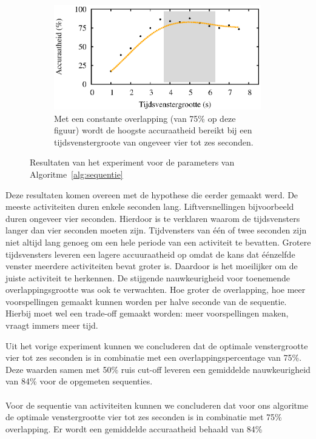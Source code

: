 \documentclass{article}
\begin{document}
\begin{figure}[h]
  \begin{subfigure}[b]{.99\linewidth}
    \centering
    \includegraphics[width=0.99\textwidth]{figures/constantoverlap}
    \caption{Met een constante overlapping (van 75\% op deze figuur) wordt de hoogste accuraatheid bereikt bij een tijdsvenstergroote van ongeveer vier tot zes seconden.}\label{fig:seq2d}
  \end{subfigure}
  
  \caption{Resultaten van het experiment voor de parameters van Algoritme~\ref{alg:sequentie}}
  \label{fig:expsequenties}
  
\end{figure}

Deze resultaten komen overeen met de hypothese die eerder gemaakt werd. De meeste activiteiten duren enkele seconden lang. Liftversnellingen bijvoorbeeld duren ongeveer vier seconden. Hierdoor is te verklaren waarom de tijdsvensters langer dan vier seconden moeten zijn. Tijdvensters van \'e\'en of twee seconden zijn niet altijd lang genoeg om een hele periode van een activiteit te bevatten. Grotere tijdsvensters leveren een lagere accuuraatheid op omdat de kans dat \'e\'enzelfde venster meerdere activiteiten bevat groter is. Daardoor is het moeilijker om de juiste activiteit te herkennen. De stijgende nauwkeurigheid voor toenemende overlappingsgrootte was ook te verwachten. Hoe groter de overlapping, hoe meer voorspellingen gemaakt kunnen worden per halve seconde van de sequentie. Hierbij moet wel een trade-off gemaakt worden: meer voorspellingen maken, vraagt immers meer tijd.

Uit het vorige experiment kunnen we concluderen dat de optimale venstergrootte vier tot zes seconden is in combinatie met een overlappingspercentage van 75\%. Deze waarden samen met 50\% ruis cut-off leveren een gemiddelde nauwkeurigheid van 84\% voor de opgemeten sequenties.
\\~\\
Voor de sequentie van activiteiten kunnen we concluderen dat voor ons algoritme de optimale venstergrootte vier tot zes seconden is in combinatie met 75\% overlapping. Er wordt een gemiddelde accuraatheid behaald van 84\%
\end{document}
